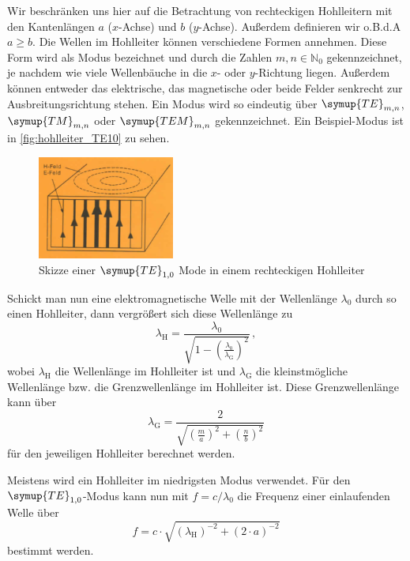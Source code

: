 Wir beschränken uns hier auf die Betrachtung von rechteckigen Hohlleitern mit den Kantenlängen $a$ ($x$-Achse) und $b$ ($y$-Achse).
Außerdem definieren wir o.B.d.A $a \geq b$.
Die Wellen im Hohlleiter können verschiedene Formen annehmen. 
Diese Form wird als Modus bezeichnet und durch die Zahlen $m,n \in \mathbb{N}_0$ gekennzeichnet, je nachdem wie viele Wellenbäuche in die $x$- oder $y$-Richtung liegen.
Außerdem können entweder das elektrische, das magnetische oder beide Felder senkrecht zur Ausbreitungsrichtung stehen.
Ein Modus wird so eindeutig über $\symup{TE}_{m,n}$, $\symup{TM}_{m,n}$ oder $\symup{TEM}_{m,n}$ gekennzeichnet. 
Ein Beispiel-Modus ist in \autoref{fig:hohlleiter_TE10} zu sehen.

\begin{figure}
    \centering
    \includegraphics[width=0.4\textwidth]{images/hohlleiter_TE10.png}
    \caption{Skizze einer $\symup{TE}_{1,0}$ Mode in einem rechteckigen Hohlleiter \cite{V53_old}}
    \label{fig:hohlleiter_TE10}
\end{figure}

Schickt man nun eine elektromagnetische Welle mit der Wellenlänge $\lambda_0$ durch so einen Hohlleiter,
dann vergrößert sich diese Wellenlänge zu
\begin{equation}
    \lambda_\text{H} = \frac{\lambda_0}{ \sqrt{ 1 - \left( \frac{\lambda_0}{\lambda_\text{G}} \right)^2 } } \, ,
\end{equation}
wobei $\lambda_\text{H}$ die Wellenlänge im Hohlleiter ist und $\lambda_\text{G}$ die kleinstmögliche Wellenlänge bzw. die Grenzwellenlänge im Hohlleiter ist.
Diese Grenzwellenlänge kann über
\begin{equation}
    \lambda_\text{G} = \frac{2}{ \sqrt{ \left( \frac{m}{a} \right)^2 + \left( \frac{n}{b} \right)^2 } }
\end{equation}
für den jeweiligen Hohlleiter berechnet werden.

Meistens wird ein Hohlleiter im niedrigsten Modus verwendet.
Für den $\symup{TE}_{1,0}$-Modus kann nun mit $f=c/\lambda_0$ die Frequenz einer einlaufenden Welle über
\begin{equation}
    f = c \cdot \sqrt{ \left( \lambda_\text{H} \right)^{-2} + \left( 2 \cdot a \right)^{-2} }
    \label{eq:frequenz}
\end{equation}
bestimmt werden.

